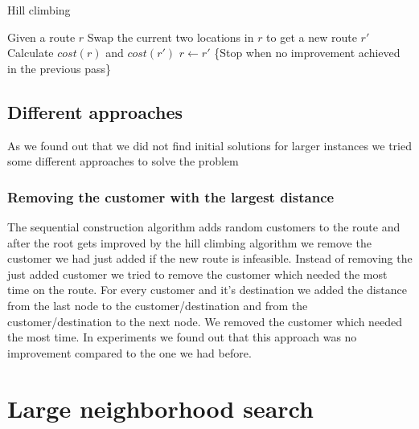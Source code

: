 \documentclass[fleqn]{scrartcl}
\begin{document}
\begin{algorithm}
\caption{Hill climbing}\label{hillclimb}
\begin{algorithmic}[1]
\State Given a route $r$
\Repeat
{}
\State Swap the current two locations in $r$ to get a new route $r'$
\State Calculate $cost(r)$ and $cost(r')$
\State $r \gets r'$
\EndIf
\EndIf
\EndFor
{} \{Stop when no improvement achieved in the previous pass\}
\end{algorithmic}
\end{algorithm}


\subsection{Different approaches}
As we found out that we did not find initial solutions for larger instances we tried some different approaches to solve the problem

\subsubsection{Removing the customer with the largest distance}
The sequential construction algorithm adds random customers to the route and after the root gets improved by the hill climbing algorithm we remove the customer we had just added if the new route is infeasible. Instead of removing the just added customer we tried to remove the customer which needed the most time on the route. For every customer and it's destination we added the distance from the last node to the customer/destination and from the customer/destination to the next node. We removed the customer which needed the most time. In experiments we found out that this approach was no improvement compared to the one we had before.

\newpage
\section{Large neighborhood search}
\end{document}
